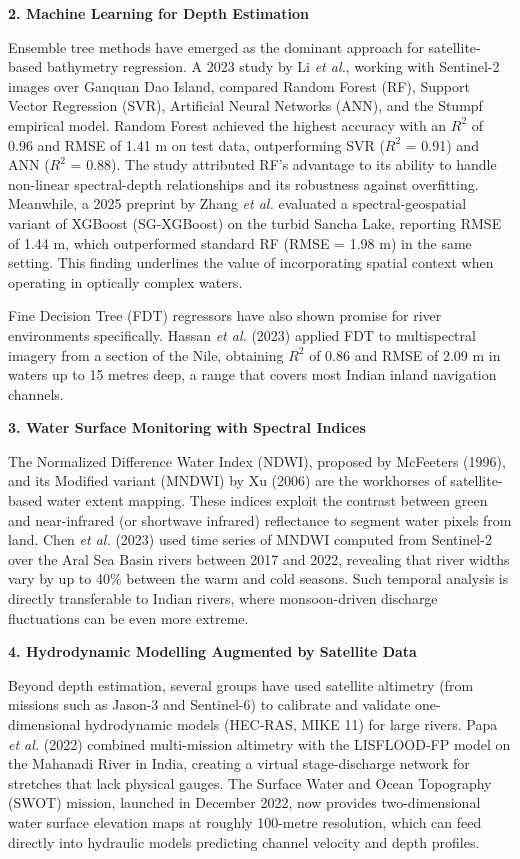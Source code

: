 \documentclass[12pt,a4paper]{article}
\begin{document}
\textbf{2. Machine Learning for Depth Estimation}

Ensemble tree methods have emerged as the dominant approach for satellite-based bathymetry regression. A 2023 study by Li \textit{et al.}, working with Sentinel-2 images over Ganquan Dao Island, compared Random Forest (RF), Support Vector Regression (SVR), Artificial Neural Networks (ANN), and the Stumpf empirical model. Random Forest achieved the highest accuracy with an $R^{2}$ of 0.96 and RMSE of 1.41 m on test data, outperforming SVR ($R^{2}$ = 0.91) and ANN ($R^{2}$ = 0.88). The study attributed RF's advantage to its ability to handle non-linear spectral-depth relationships and its robustness against overfitting. Meanwhile, a 2025 preprint by Zhang \textit{et al.} evaluated a spectral-geospatial variant of XGBoost (SG-XGBoost) on the turbid Sancha Lake, reporting RMSE of 1.44 m, which outperformed standard RF (RMSE = 1.98 m) in the same setting. This finding underlines the value of incorporating spatial context when operating in optically complex waters.

Fine Decision Tree (FDT) regressors have also shown promise for river environments specifically. Hassan \textit{et al.} (2023) applied FDT to multispectral imagery from a section of the Nile, obtaining $R^{2}$ of 0.86 and RMSE of 2.09 m in waters up to 15 metres deep, a range that covers most Indian inland navigation channels.

\textbf{3. Water Surface Monitoring with Spectral Indices}

The Normalized Difference Water Index (NDWI), proposed by McFeeters (1996), and its Modified variant (MNDWI) by Xu (2006) are the workhorses of satellite-based water extent mapping. These indices exploit the contrast between green and near-infrared (or shortwave infrared) reflectance to segment water pixels from land. Chen \textit{et al.} (2023) used time series of MNDWI computed from Sentinel-2 over the Aral Sea Basin rivers between 2017 and 2022, revealing that river widths vary by up to 40\% between the warm and cold seasons. Such temporal analysis is directly transferable to Indian rivers, where monsoon-driven discharge fluctuations can be even more extreme.

\textbf{4. Hydrodynamic Modelling Augmented by Satellite Data}

Beyond depth estimation, several groups have used satellite altimetry (from missions such as Jason-3 and Sentinel-6) to calibrate and validate one-dimensional hydrodynamic models (HEC-RAS, MIKE 11) for large rivers. Papa \textit{et al.} (2022) combined multi-mission altimetry with the LISFLOOD-FP model on the Mahanadi River in India, creating a virtual stage-discharge network for stretches that lack physical gauges. The Surface Water and Ocean Topography (SWOT) mission, launched in December 2022, now provides two-dimensional water surface elevation maps at roughly 100-metre resolution, which can feed directly into hydraulic models predicting channel velocity and depth profiles.
\end{document}
